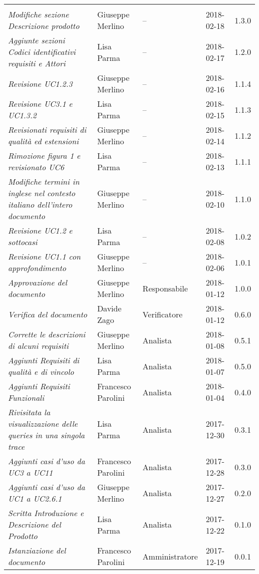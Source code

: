 \newpage 
\section*{}
\begin{longtable}{C{4cm}|C{3cm}|C{3cm}|C{2.5cm}|C{2cm}}
		 & & & & \\
		\emph{Modifiche sezione Descrizione prodotto} & Giuseppe Merlino & -- & 2018-02-18 & 1.3.0 \\
		\hline		
		\emph{Aggiunte sezioni Codici identificativi requisiti e Attori} & Lisa Parma & -- & 2018-02-17 & 1.2.0 \\
		\hline
		\emph{Revisione  UC1.2.3 }& Giuseppe Merlino & -- & 2018-02-16 & 1.1.4 \\
		\hline
		\emph{Revisione UC3.1 e UC1.3.2}& Lisa Parma & -- & 2018-02-15 & 1.1.3 \\
		\hline
		\emph{Revisionati requisiti di qualità ed estensioni}&Giuseppe Merlino & -- & 2018-02-14 & 1.1.2 \\
		\hline
		\emph{Rimozione figura 1 e revisionato UC6}& Lisa Parma & -- & 2018-02-13 & 1.1.1 \\
		\hline
		\emph{Modifiche termini in inglese nel contesto italiano dell'intero documento}& Giuseppe Merlino & -- & 2018-02-10 & 1.1.0 \\
		\hline
		\emph{Revisione UC1.2 e sottocasi}& Lisa Parma & -- & 2018-02-08 & 1.0.2 \\
		\hline
		\emph{Revisione UC1.1 con approfondimento}& Giuseppe Merlino & -- & 2018-02-06 & 1.0.1 \\
		\hline
		\emph{Approvazione del documento}& Giuseppe Merlino & Responsabile & 2018-01-12 & 1.0.0 \\
		\hline
		\emph{Verifica del documento}& Davide Zago & Verificatore & 2018-01-12 & 0.6.0 \\
		\hline
		\emph{Corrette le descrizioni di alcuni requisiti}& Giuseppe Merlino & Analista & 2018-01-08 & 0.5.1 \\
		\hline
		\emph{Aggiunti Requisiti di qualità e di vincolo}& Lisa Parma & Analista & 2018-01-07 & 0.5.0 \\
		\hline
		\emph{Aggiunti Requisiti Funzionali}& Francesco Parolini & Analista & 2018-01-04 & 0.4.0 \\
		\hline
		\emph{Rivisitata la visualizzazione delle queries in una singola trace}& Lisa Parma & Analista & 2017-12-30 & 0.3.1 \\
		\hline
		\emph{Aggiunti casi d'uso da UC3 a UC11}& Francesco Parolini & Analista & 2017-12-28 & 0.3.0 \\
		\hline
		\emph{Aggiunti casi d'uso da UC1 a UC2.6.1}& Giuseppe Merlino & Analista & 2017-12-27 & 0.2.0 \\
		\hline
		\emph{Scritta Introduzione e Descrizione del Prodotto}& Lisa Parma & Analista & 2017-12-22 & 0.1.0 \\
		\hline
		\emph{Istanziazione del documento}& Francesco Parolini & Amministratore & 2017-12-19 & 0.0.1 \\
		\hline
\end{longtable}
\clearpage